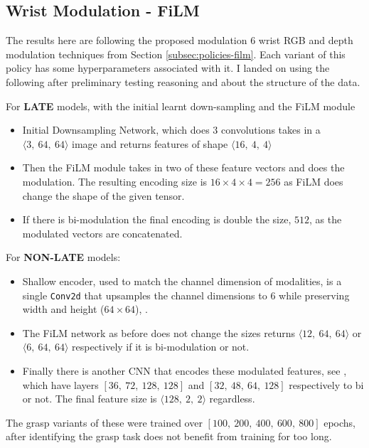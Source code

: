 \subsection{Wrist Modulation - FiLM}
The results here are following the proposed modulation 6 wrist RGB and depth modulation techniques from Section \ref{subsec:policies-film}. Each variant of this policy has some hyperparameters associated with it. I landed on using the following after preliminary testing reasoning and about the structure of the data.

For \textbf{LATE} models, with the initial learnt down-sampling and the FiLM module
\begin{itemize}
  \item Initial Downsampling Network, which does $3$ convolutions takes in a \(\langle 3, ~64, ~64 \rangle\) image and returns features of shape \(\langle 16, ~4, ~4 \rangle \)
  \item Then the FiLM module takes in two of these feature vectors and does the modulation. The resulting encoding size is \(16 \times 4 \times 4 = 256\) as FiLM does change the shape of the given tensor.
  \item If there is bi-modulation the final encoding is double the size, $512$, as the modulated vectors are concatenated.
\end{itemize}

For \textbf{NON-LATE} models:
\begin{itemize}
  \item Shallow encoder, used to match the channel dimension of modalities, is a single \verb|Conv2d|  that upsamples the channel dimensions to $6$ while preserving width and height ($64 \times 64$), .
  \item The FiLM network as before does not change the sizes returns \(\langle 12, ~64, ~64 \rangle \) or \(\langle 6, ~64, ~64 \rangle \) respectively if it is bi-modulation or not.
  \item Finally there is another CNN that encodes these modulated features, see , which have layers $\left[36, ~72, ~128, ~128\right]$ and $\left[32, ~48, ~64, ~128\right]$ respectively to bi or not. The final feature size is \(\langle 128, ~2, ~2 \rangle\) regardless.
\end{itemize}
The grasp variants of these were trained over \(\left[ 100, ~200, ~400, ~600, ~800\right]\) epochs, after identifying the grasp task does not benefit from training for too long.


